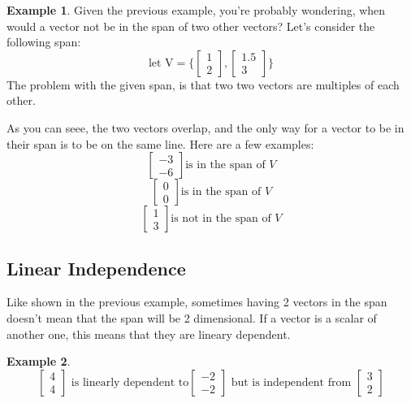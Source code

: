 \documentclass[table]{article}
\theoremstyle{definition}
\newtheorem{ex}{Example}[section]
\begin{document}
  \begin{ex}
    Given the previous example, you're probably wondering, when would a vector not be in the span of two other vectors? Let's consider the following span:
    \[\text{let V} = \{
      \begin{bmatrix}
        1 \\ 2
      \end{bmatrix}
      ,
      \begin{bmatrix}
        1.5 \\ 3
      \end{bmatrix}
    \}\]
    The problem with the given span, is that two two vectors are multiples of each other.  
    \begin{center}
  \end{center}

  As you can seee, the two vectors overlap, and the only way for a vector to be in their span is to be on the same line. Here are a few examples: 
  \[ \begin{bmatrix}
    -3 \\ -6
  \end{bmatrix} \text{is in the span of } V\]
  \[ \begin{bmatrix}
    0 \\ 0
  \end{bmatrix} \text{is in the span of } V\]
  \[ \begin{bmatrix}
    1 \\ 3
  \end{bmatrix} \text{is not in the span of } V\]
  \end{ex}
  \subsection{Linear Independence}
  Like shown in the previous example, sometimes having 2 vectors in the span doesn't mean that the span will be 2 dimensional. If a vector is a scalar of another one, this means that they are lineary dependent.
  \begin{ex}
    \[
    \begin{bmatrix}
      4 \\ 4
    \end{bmatrix}
    \text{ is linearly dependent to}
    \begin{bmatrix}
      -2 \\ -2
    \end{bmatrix}
    \text{ but is independent from }
    \begin{bmatrix}
      3 \\ 2
    \end{bmatrix}
    \]
  \end{ex}
\end{document}
